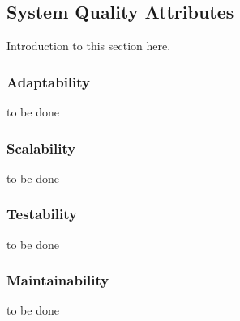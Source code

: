     \subsection{System Quality Attributes}
    Introduction to this section here.
        \subsubsection{Adaptability}
        to be done
        \subsubsection{Scalability}
        to be done
        \subsubsection{Testability}
        to be done
        \subsubsection{Maintainability}
        to be done
    
    
    